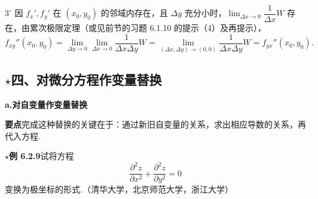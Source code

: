 \documentclass[UTF8,12pt,a4paper,fontset=fandol]{ctexart}
\begin{document}
$3^\circ$ 因 $f_x',f_y'$ 在 $(x_0,y_0)$ 的邻域内存在，且 $\Delta y$ 充分小时，$\displaystyle\lim_{\Delta x\to0}\dfrac1{\Delta x}W$ 存在，由累次极限定理（或见前节的习题 6.1.10 的提示（4）及再提示），
\[
  f_{xy}''(x_0,y_0)
  =\lim_{\Delta y\to0}\lim_{\Delta x\to0}\frac1{\Delta x\Delta y}W
  =\lim_{(\Delta x,\Delta y)\to(0,0)}\frac1{\Delta x\Delta y}W
  =f_{yx}''(x_0,y_0).
\]

\subsection*{\ensuremath{\star}四、对微分方程作变量替换}

\noindent\textbf{a.\quad 对自变量作变量替换}

\noindent\textbf{要点}\quad 完成这种替换的关键在于：通过新旧自变量的关系，求出相应导数的关系，再代入方程.

\noindent\textbf{\ensuremath{\star}例 6.2.9}\quad 试将方程
\[
  \frac{\partial^2z}{\partial x^2}+\frac{\partial^2z}{\partial y^2}=0
\]
变换为极坐标的形式.（清华大学，北京师范大学，浙江大学）
\end{document}

